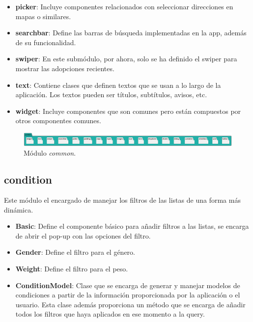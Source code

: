 \documentclass[a4paper, 12pt]{article}
\begin{document}
\begin{itemize}[noitemsep]
	\item \textbf{picker}: Incluye componentes relacionados con seleccionar direcciones en mapas o similares.
	\item \textbf{searchbar}: Define las barras de búsqueda implementadas en la app, además de su funcionalidad.
	\item \textbf{swiper}: En este submódulo, por ahora, solo se ha definido el swiper para mostrar las adopciones recientes.
	\item \textbf{text}: Contiene clases que definen textos que se usan a lo largo de la aplicación. Los textos pueden ser títulos, subtítulos, avisos, etc.
	\item \textbf{widget}: Incluye componentes que son comunes pero están compuestos por otros componentes comunes.
\end{itemize}


\begin{figure}[H]
	\begin{center}
		{\includegraphics[width=0.8\linewidth]{diagram/Common.png}\par}
		\caption{Módulo  \textit{common}.}
	\end{center}
\end{figure}

\subsection*{condition}

Este módulo el encargado de manejar los filtros de las listas de una forma más dinámica. 

\begin{itemize}[noitemsep]
	\item \textbf{Basic}: Define el componente básico para añadir filtros a las listas, se encarga de abrir el pop-up con las opciones del filtro.
	\item \textbf{Gender}: Define el filtro para el género.
	\item \textbf{Weight}: Define el filtro para el peso.
	\item \textbf{ConditionModel}: Clase que se encarga de generar y manejar modelos de condiciones a partir de la información proporcionada por la aplicación o el usuario. Esta clase además proporciona un método que se encarga de añadir todos los filtros que haya aplicados en ese momento a la query.
\end{itemize}
\end{document}

